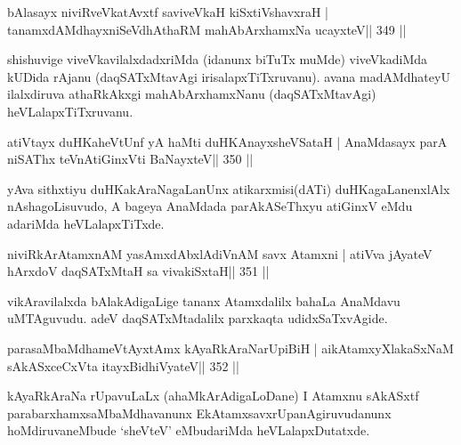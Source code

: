 
\begin{shl}
bAlasayx niviRveVkatAvxtf saviveVkaH kiSxtiVshavxraH |
tanamxdAMdhayxniSeVdhAthaRM mahAbArxhamxNa ucayxteV\hfill || 349 ||
\end{shl}

\begin{artha}
shishuvige viveVkavilalxdadxriMda (idanunx biTuTx muMde) viveVkadiMda  kUDida rAjanu (daqSATxMtavAgi irisalapxTiTxruvanu). avana madAMdhateyU ilalxdiruva athaRkAkxgi mahAbArxhamxNanu (daqSATxMtavAgi) heVLalapxTiTxruvanu.
\end{artha}



\begin{shl}
atiVtayx duHKaheVtUnf yA haMti duHKAnayxsheVSataH |
AnaMdasayx parA niSAThx teVnAtiGinxVti BaNayxteV\hfill || 350 ||
\end{shl}

\begin{artha}
yAva sithxtiyu duHKakAraNagaLanUnx atikarxmisi(dATi) duHKagaLanenxlAlx nAshagoLisuvudo, A bageya AnaMdada parAkASeThxyu atiGinxV eMdu adariMda heVLalapxTiTxde.
\end{artha}


\begin{shl}
niviRkArAtamxnAM yasAmxdAbxlAdiVnAM savx Atamxni |
atiVva jAyateV hArxdoV daqSATxMtaH sa vivakiSxtaH\hfill || 351 ||
\end{shl}

\begin{artha}
vikAravilalxda bAlakAdigaLige tananx Atamxdalilx bahaLa AnaMdavu  uMTAguvudu. adeV daqSATxMtadalilx parxkaqta udidxSaTxvAgide.
\end{artha}


\begin{shl}
parasaMbaMdhameVtAyxtAmx kAyaRkAraNarUpiBiH |
aikAtamxyXlakaSxNaM sAkASxceCxVta itayxBidhiVyateV\hfill || 352 ||
\end{shl}

\begin{artha}
kAyaRkAraNa rUpavuLaLx (ahaMkArAdigaLoDane) I Atamxnu sAkASxtf  para\-barxhamxsaMbaMdhavanunx EkAtamxsavxrUpanAgiruvudanunx  hoMdiruvaneMbude `sheVteV' eMbudariMda heVLalapxDutatxde.
\end{artha}

